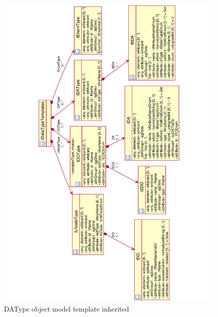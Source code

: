 \begin{landscape}
	\begin{figure}
	  \includegraphics[angle=-90, width=1.0\linewidth]{chapters/ch-scl/figures/SCL-uml-DATypeTemplate-Deept2-inherited}
	  \caption{DAType object model template inherited}  
	  \label{fig:pdf-SCL-uml-DATypeTemplate-Deept2-inherited}
	\end{figure}
\end{landscape}

